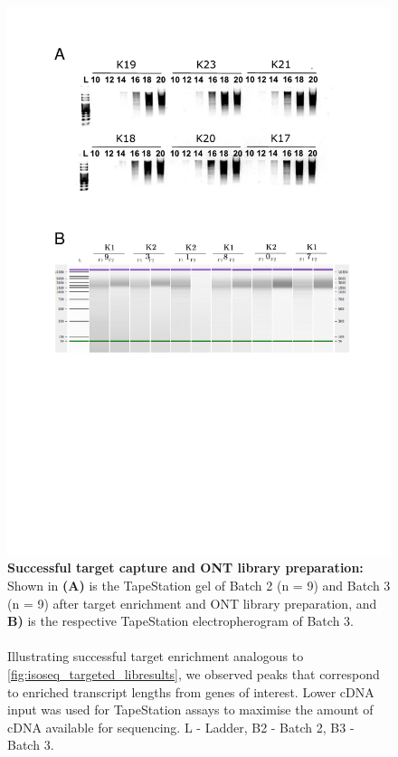 \begin{figure}[!htp]
	\centering
	\vspace{20pt}
	\includegraphics[page=3,trim={0 17cm 0cm 0cm},clip,scale = 0.75]{Figures/TargetedTranscriptome_ppt.pdf}
	\captionsetup{width=0.95\textwidth}
	\caption[ONT Targeted Transcriptome - Target Capture and library preparation]%
	{\textbf{Successful target capture and ONT library preparation:} Shown in \textbf{(A)} is the TapeStation gel of Batch 2 (n = 9) and Batch 3 (n = 9) after target enrichment and ONT library preparation, and \textbf{B)} is the respective TapeStation electropherogram of Batch 3. 
	\\
	\\
	Illustrating successful target enrichment analogous to \cref{fig:isoseq_targeted_libresults}, we observed peaks that correspond to enriched transcript lengths from genes of interest. Lower cDNA input was used for TapeStation assays to maximise the amount of cDNA available for sequencing. L - Ladder, B2 - Batch 2, B3 - Batch 3.}  
	\label{fig:ONT_targeted_libresults}
\end{figure}

